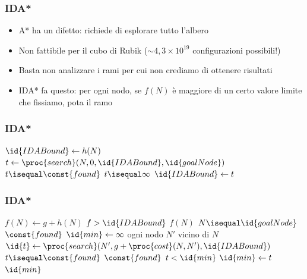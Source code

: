 \documentclass{beamer}
\begin{document}
\begin{frame}
\frametitle{IDA*}
\begin{itemize}
\item A* ha un difetto: richiede di esplorare tutto l'albero
\item Non fattibile per il cubo di Rubik ($\sim 4,3\times 10^{19}$
configurazioni possibili!)
\item Basta non analizzare i rami per cui non crediamo di ottenere risultati
\item IDA* fa questo: per ogni nodo, se $f(N)$ è maggiore di un certo valore
limite che fissiamo, pota il ramo
\end{itemize}
\end{frame}

\begin{frame}
\frametitle{IDA*}
\begin{codebox}
\li $\id{IDABound}\gets h(N)$
\li \While {}
\li \Do
        $t\gets\proc{search}(N, 0, \id{IDABound}, \id{goalNode})$
\li     \If $t\isequal\const{found}$
\li     \Then
            \Return {}
        \End
\li     \If $t\isequal\infty$
\li     \Then
            \Return {}
        \End
\li     $\id{IDABound}\gets t$
    \End
\end{codebox}
\end{frame}

\begin{frame}
\frametitle{IDA*}
\begin{codebox}
\li $f(N)\gets g + h(N)$
\li \If $f > \id{IDABound}$
\li \Then
        \Return $f(N)$
    \End
\li \If $N\isequal \id{goalNode}$
\li \Then
        \Return $\const{found}$
    \End
\li $\id{min}\gets\infty$
\li \For ogni nodo $N'$ vicino di $N$
\li \Do
        $\id{t}\gets\proc{search}(N', g + \proc{cost}(N, N'), \id{IDABound})$
\li     \If $t\isequal\const{found}$
\li     \Then
            \Return $\const{found}$
        \End
\li     \If $t < \id{min}$
\li     \Then
            $\id{min}\gets t$
        \End
    \End
\li \Return $\id{min}$
\end{codebox}
\end{frame}
\end{document}
